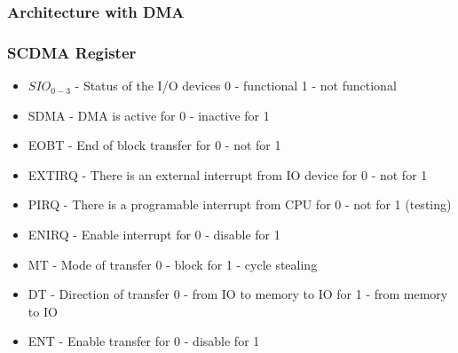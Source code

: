 \begin{frame}
    \frametitle{Architecture with DMA}
    \begin{figure}
        \centering
    \end{figure}
\end{frame}

\begin{frame}
    \frametitle{SCDMA Register}
    \begin{table}[]
    \end{table}
    \begin{itemize}
        \item $SIO_{0-3}$ - Status of the I/O devices 0 - functional 1 - not functional
        \item SDMA - DMA is active for 0 - inactive for 1
        \item EOBT - End of block transfer for 0 - not for 1
        \item EXTIRQ - There is an external interrupt from IO device for 0 - not for 1
        \item PIRQ - There is a programable interrupt from CPU for 0 - not for 1 (testing)
        \item ENIRQ - Enable interrupt for 0 - disable for 1
        \item MT - Mode of transfer 0 - block for 1 - cycle stealing
        \item DT - Direction of transfer 0 - from IO to memory to IO for 1 - from memory to IO
        \item ENT - Enable transfer for 0 - disable for 1
    \end{itemize}
    \note{
    }
\end{frame}

